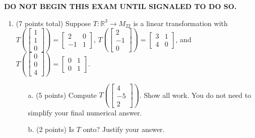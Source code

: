 \documentclass[12pt]{extarticle}
\begin{document}
\bigskip

\textbf{DO NOT BEGIN THIS EXAM UNTIL SIGNALED TO DO SO.}



\newpage



\begin{enumerate}

\item (7 points total) Suppose $T:\mathbb{R}^3\to M_{22}$ is a linear transformation with $T\left(\begin{bmatrix} 1 \\ 1 \\ 0\end{bmatrix}\right)=\begin{bmatrix} 2 & 0 \\ -1 & 1\end{bmatrix} $, $T\left(\begin{bmatrix} 2 \\ -1 \\ 0\end{bmatrix}\right)=\begin{bmatrix} 3 & 1 \\ 4 & 0\end{bmatrix} $, and $T\left(\begin{bmatrix} 0 \\ 0 \\ 4\end{bmatrix}\right)=\begin{bmatrix} 0 & 1 \\ 0 & 1\end{bmatrix} $.

\begin{itemize}

\item[a.] (5 points) Compute $T\left(\begin{bmatrix}4\\ -5\\2\end{bmatrix}\right)$. Show all work. You do not need to simplify your final numerical answer. 

    \vfill
  
\item[b.] (2 points) Is $T$ onto? Justify your answer.

\vspace{1.5in}
\end{itemize}



\newpage


\end{enumerate}
\end{document}

